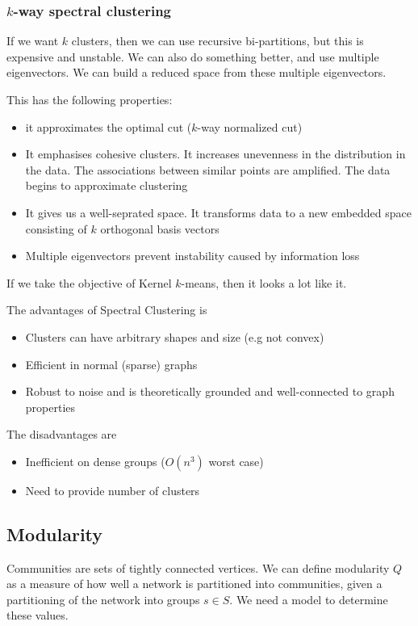     
\subsubsection{$k$-way spectral clustering}
    If we want $k$ clusters, then we can use recursive bi-partitions, but this is expensive and unstable. We can also do something better, and use multiple eigenvectors. We can build a reduced space from these multiple eigenvectors. 
    
    This has the following properties:
    \begin{itemize}
        \item it approximates the optimal cut ($k$-way normalized cut)
        \item It emphasises cohesive clusters. It increases unevenness in the distribution in the data. The associations between similar points are amplified. The data begins to approximate clustering
        \item It gives us a well-seprated space. It transforms data to a new embedded space consisting of $k$ orthogonal basis vectors
        \item Multiple eigenvectors prevent instability caused by information loss
    \end{itemize}
    If we take the objective of Kernel $k$-means, then it looks a lot like it. 
    
    The advantages of Spectral Clustering is
    \begin{itemize}
        \item Clusters can have arbitrary shapes and size (e.g not convex)
        \item Efficient in normal (sparse) graphs
        \item Robust to noise and is theoretically grounded and well-connected to graph properties
    \end{itemize}
    The disadvantages are
    \begin{itemize}
        \item Inefficient on dense groups ($O(n^3)$ worst case)
        \item Need to provide number of clusters
    \end{itemize}
    
\subsection{Modularity}
    Communities are sets of tightly connected vertices. We can define modularity $Q$ as a measure of how well a network is partitioned into communities, given a partitioning of the network into groups $s \in S$. 
    We need a model to determine these values. 
    

